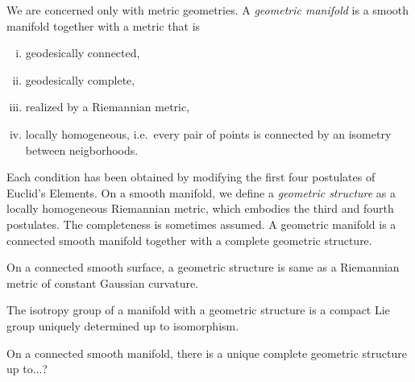 \documentclass{../../large}
\begin{document}
\begin{prb}
We are concerned only with metric geometries.
A \emph{geometric manifold} is a smooth manifold together with a metric that is
\begin{enumerate}[(i)]
\item geodesically connected,
\item geodesically complete,
\item realized by a Riemannian metric,
\item locally homogeneous, i.e.~every pair of points is connected by an isometry between neigborhoods.
\end{enumerate}
Each condition has been obtained by modifying the first four postulates of Euclid's Elements.
On a smooth manifold, we define a \emph{geometric structure} as a locally homogeneous Riemannian metric, which embodies the third and fourth postulates.
The completeness is sometimes assumed.
A geometric manifold is a connected smooth manifold together with a complete geometric structure.
\begin{parts}
\item On a connected smooth surface, a geometric structure is same as a Riemannian metric of constant Gaussian curvature.
\item The isotropy group of a manifold with a geometric structure is a compact Lie group uniquely determined up to isomorphism.

\item On a connected smooth manifold, there is a unique complete geometric structure up to...?
\end{parts}
\end{prb}
\end{document}
